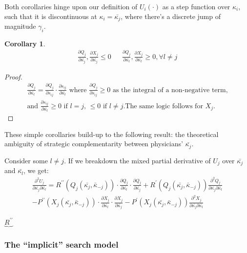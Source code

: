 \documentclass{article}
\newtheorem{corollary}[theorem]{Corollary}
\begin{document}
Both corollaries hinge upon our definition of $U_i(\cdot)$ as a step function over $\kappa_i$, such that it is discontinuous at $\kappa_i = \bar{\kappa_j}$, where there's a discrete jump of magnitude  $\gamma_i$.

\begin{corollary}
\begin{align*}
    \frac{\partial Q_{j}}{\partial\bar{\kappa_{j}}},\frac{\partial X_{j}}{\partial\bar{\kappa_{j}}} \leq 0 &&  \frac{\partial Q_{j}}{\partial\bar{\kappa_{l}}}, \frac{\partial X_{j}}{\partial\bar{\kappa_{l}}} \geq 0, \forall l \neq j
\end{align*}
\end{corollary}

\begin{proof}
\begin{align*}
\frac{\partial Q_{j}}{\partial\bar{\kappa_{l}}} = \frac{\partial Q_{j}}{\partial s_{ij}} \cdot \frac{\partial s_{ij}}{\partial\bar{\kappa_{l}}} \text{ where $\frac{\partial Q_{j}}{\partial s_{ij}} \geq 0$ as the integral of a non-negative term,} \\ \text{and $\frac{\partial s_{ij}}{\partial\bar{\kappa_{l}}} \geq 0$ if $l = j$, $\leq 0$ if $l \neq  j$.}  \text{The same logic follows for $X_j$.}
\end{align*}
\end{proof}

These simple corollaries build-up to the following result: the theoretical ambiguity of strategic complementarity between physicians' $\bar{\kappa_j}$.

Consider some $l \neq j$. If we breakdown the mixed partial derivative of $U_j$ over $\bar{\kappa_j}$ and $\bar{\kappa_l}$, we get:
\begin{align*}
\frac{\partial^2 U_{j}}{\partial\bar{\kappa_{j}} \partial\bar{\kappa_{l}}}  = 
R^{\prime \prime} (Q_j(\bar{\kappa_j}, \bar{\kappa}_{-j}))
\cdot \frac{\partial Q_{j}}{\partial\bar{\kappa_{l}}}
\cdot \frac{\partial Q_{j}}{\partial\bar{\kappa_{j}}}  + 
R^{\prime} (Q_j(\bar{\kappa_j}, \bar{\kappa}_{-j})) \frac{\partial^2 Q_{j}}{\partial\bar{\kappa_{j}} \partial\bar{\kappa_{l}}} \\
 - P^{\prime \prime} (X_j(\bar{\kappa_j}, \bar{\kappa}_{-j}))
\cdot \frac{\partial X_{j}}{\partial\bar{\kappa_{l}}}
\cdot \frac{\partial X_{j}}{\partial\bar{\kappa_{j}}}  - 
P^{\prime} (X_j(\bar{\kappa_j}, \bar{\kappa}_{-j})) \frac{\partial^2 X_{j}}{\partial\bar{\kappa_{j}} \partial\bar{\kappa_{l}}} 
\end{align*}

$\underbrace{R^{\prime \prime}}$

\subsubsection{The ``implicit'' search model}
\end{document}
